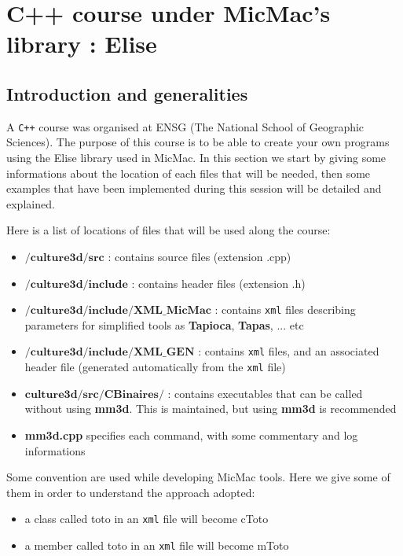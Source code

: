 

\section{C++ course under MicMac's library : Elise}
\subsection{Introduction and generalities}
A \verb!C++! course was organised at ENSG (The National School of Geographic Sciences). The purpose of this course is to be able to create your own programs using the Elise library used in MicMac. In this section we start by giving some informations about the location of each files that will be needed, then some examples that have been implemented during this session will be detailed and explained.\newline

Here is a list of locations of files that will be used along the course:\newline
\begin{itemize}
\item $\textbf{/culture3d/src}$ : contains source files (extension .cpp) \newline
\item $\textbf{/culture3d/include}$ : contains header files (extension .h)\newline
\item $\textbf{/culture3d/include/XML\_MicMac}$ : contains \verb!xml! files describing parameters for simplified tools as \textbf{Tapioca}, \textbf{Tapas}, ... etc\newline
\item $\textbf{/culture3d/include/XML\_GEN}$ : contains \verb!xml! files, and an associated header file (generated automatically from the \verb!xml! file)\newline
\item $\textbf{culture3d/src/CBinaires/}$ : contains executables that can be called without using \textbf{mm3d}. This is maintained, but using \textbf{mm3d} is recommended\newline
\item \textbf{mm3d.cpp} specifies each command, with some commentary and log informations\newline
\end{itemize}

Some convention are used while developing MicMac tools. Here we give some of them in order to understand the approach adopted: \newline
\begin{itemize}
\item a class called toto in an \verb!xml! file will become cToto \newline
\item a member called toto in an \verb!xml! file will become mToto \newline
\end{itemize}

